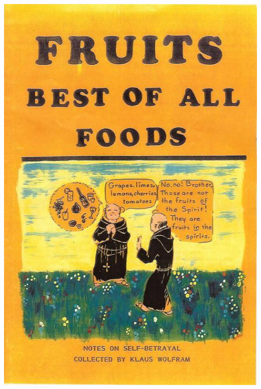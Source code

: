 \documentclass[landscape,twocolumn,letterpaper]{article}
\begin{document}
\includegraphics[height=1.1\textheight,bb= 0 0 529 797]{./cover.jpg}
\clearpage%
\end{document}
